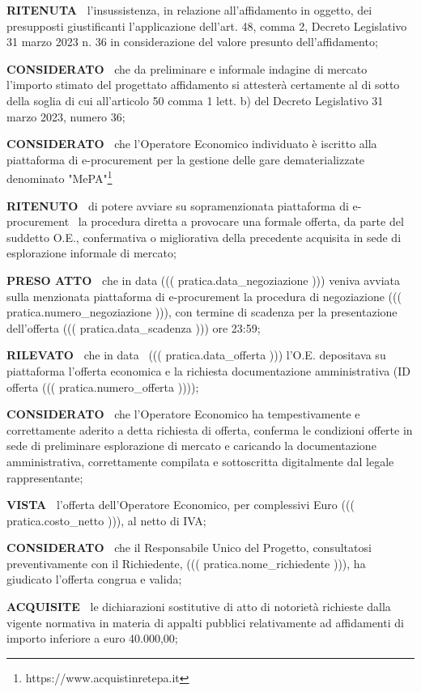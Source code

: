 \textbf{RITENUTA~}  l’insussistenza, in relazione
all’affidamento in oggetto, dei presupposti giustificanti
l’applicazione dell’art. 48, comma 2, Decreto Legislativo 31 marzo
2023 n. 36  in considerazione del valore presunto dell’affidamento; 

\textbf{CONSIDERATO~} che da preliminare e informale indagine
di mercato l’importo stimato del progettato affidamento si attesterà
certamente al di sotto della soglia di cui all’articolo 50 comma 1
lett. b) del Decreto Legislativo 31 marzo 2023, numero 36;

\textbf{CONSIDERATO~}  che l'Operatore Economico individuato
è iscritto alla piattaforma di e-procurement per la
gestione delle gare dematerializzate denominato "MePA"\footnote{https://www.acquistinretepa.it}

\textbf{RITENUTO~} di potere avviare su sopramenzionata piattaforma di
 e-procurement  la procedura diretta a provocare una formale offerta,
 da parte del suddetto O.E., confermativa o migliorativa della precedente
 acquisita in sede di esplorazione informale di mercato;

\textbf{PRESO ATTO~} che in data ((( pratica.data_negoziazione ))) veniva
 avviata sulla menzionata piattaforma di e-procurement la procedura
 di negoziazione ((( pratica.numero_negoziazione ))), con termine di
scadenza per la presentazione dell’offerta ((( pratica.data_scadenza ))) ore 23:59;


\textbf{RILEVATO~} che in data  ((( pratica.data_offerta )))
l'O.E. depositava su piattaforma l'offerta economica e la richiesta
documentazione amministrativa (ID offerta ((( pratica.numero_offerta ))));


\textbf{CONSIDERATO~} che l’Operatore Economico ha tempestivamente
e correttamente aderito a detta richiesta di offerta, conferma
le condizioni offerte in  sede di
preliminare esplorazione di mercato e caricando la documentazione
amministrativa, correttamente compilata e sottoscritta digitalmente dal
legale rappresentante;

\textbf{VISTA~} l’offerta dell’Operatore
Economico, per complessivi Euro ((( pratica.costo_netto ))), al netto di IVA;

\textbf{CONSIDERATO~} che il Responsabile Unico del
Progetto, consultatosi preventivamente con il 
 Richiedente, ((( pratica.nome_richiedente ))), ha giudicato l’offerta congrua
 e valida;

\textbf{ACQUISITE~}   le dichiarazioni sostitutive
di atto di notorietà richieste dalla vigente normativa in materia di
appalti pubblici relativamente ad affidamenti di importo inferiore a
euro 40.000,00;

